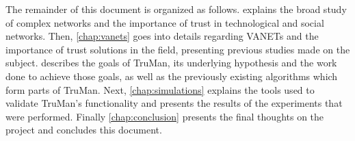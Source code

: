 





The remainder of this document is organized as follows.  explains the broad study of complex networks and the importance of trust in technological and social networks.
Then, \autoref{chap:vanets} goes into details regarding VANETs and the importance of trust solutions in the field, presenting previous studies made on the subject.
 describes the goals of TruMan, its underlying hypothesis and the work done to achieve those goals, as well as the previously existing algorithms which form parts of TruMan.
Next, \autoref{chap:simulations} explains the tools used to validate TruMan's functionality and presents the results of the experiments that were performed.
Finally \autoref{chap:conclusion} presents the final thoughts on the project and concludes this document.

